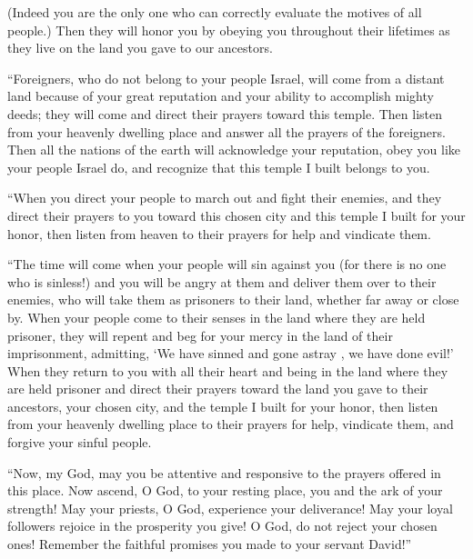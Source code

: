 {(Indeed
you
are the only
one who can correctly evaluate
the motives
of all people.)
Then
they will honor
you by obeying
you throughout
their
lifetimes
as they
live
on
the land
you gave
to our ancestors.
\par }{\PP {}“Foreigners,
who
do not
belong to your people
Israel,
will come
from a distant
land
because
of your great
reputation
and your ability
to accomplish mighty
deeds; they will come
and direct
their prayers
toward this
temple.
Then listen
from
your heavenly
dwelling
place
and answer
all
the prayers
of the foreigners.
Then all
the nations
of the earth
will acknowledge
your reputation,
obey
you
like your people
Israel
do, and recognize
that
this
temple
I built belongs to you.
\par }{\PP {}“When
you direct
your people
to march out and fight
their enemies,
and they direct
their prayers to
you toward
this chosen
city
and this temple
I built
for your honor,
then listen
from
heaven
to their prayers
for help
and vindicate them.
\par }{\PP {}“The time will come when
your people will sin
against you (for
there is no
one
who
is sinless!) and you will be angry
at them and deliver
them over
to their enemies,
who will take
them as prisoners
to
their land,
whether far away
or
close by.
When your people come
to
their senses
in the land
where
they are held prisoner,
they will repent
and beg for your mercy
in the land
of their imprisonment,
admitting,
‘We have sinned
and gone astray
, we have done evil!’
When they return
to
you with all
their heart
and being
in the land
where they are held
prisoner
and direct
their prayers
toward
the land
you gave
to their ancestors,
your chosen
city,
and the temple
I built
for your honor,
then listen
from
your heavenly
dwelling
place
to their prayers
for help,
vindicate
them, and forgive
your sinful
people.
\par }{\PP {}“Now,
my God,
may
you be attentive
and responsive
to the prayers
offered in this
place.
Now
ascend,
O
{}
God,
to your resting place,
you
and the ark
of your strength! May your priests,
O
{}
God,
experience
your deliverance! May your loyal followers
rejoice
in the prosperity you give!
O
{}
God,
do not
reject
your chosen ones! Remember
the faithful
promises you made to your servant
David!”

}
